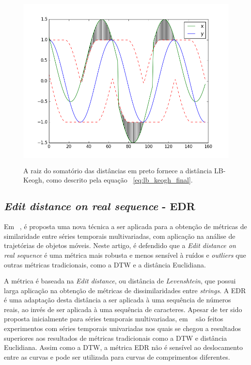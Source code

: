 \begin{figure}
	\centering
	\includegraphics[height=9cm,keepaspectratio]{figuras/lb_keogh_3.png}
	\caption{A raiz do somatório das distâncias em preto fornece a distância LB-Keogh, como descrito pela equação ~\ref{eq:lb_keogh_final}.}
	\label{fig:keogh_3}
\end{figure}

\subsection{\emph{Edit distance on real sequence} - EDR}

Em ~\parencite{EDR}, é proposta uma nova técnica a ser aplicada para a obtenção de métricas de similaridade entre séries temporais multivariadas, com aplicação na análise de trajetórias de objetos móveis. Neste artigo, é defendido que a \emph{Edit distance on real sequence} é uma métrica mais robusta e menos sensível à ruídos e \emph{outliers} que outras métricas tradicionais, como a DTW e a distância Euclidiana.

A métrica é baseada na \emph{Edit distance}, ou distância de \emph{Levenshtein}, que possui larga aplicação na obtenção de métricas de dissimilaridades entre \emph{strings}. A EDR é uma adaptação desta distância a ser aplicada à uma sequência de números reais, ao invés de ser aplicada à uma sequência de caracteres. Apesar de ter sido proposta inicialmente para séries temporais multivariadas, em ~\parencite{Serra} são feitos experimentos com séries temporais univariadas nos quais se chegou a resultados superiores aos resultados de métricas tradicionais como a DTW e distância Euclidiana. Assim como a DTW, a métrica EDR não é sensível ao deslocamento entre as curvas e pode ser utilizada para curvas de comprimentos diferentes.

